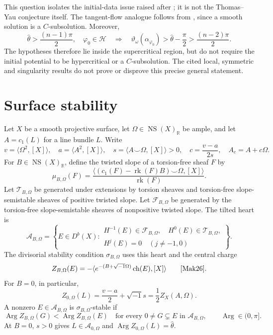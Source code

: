 \documentclass[12pt,reqno]{amsart}
\numberwithin{equation}{section}
\theoremstyle{plain}
\theoremstyle{definition}
\newcommand{\cH}{\mathcal H}
\newcommand{\R}{\mathbb R}
\DeclareMathOperator{\NS}{NS}
\begin{document}
This question isolates the initial-data issue raised after
\cite[Theorem 1.3]{Tak20}; it is not the Thomas--Yau conjecture itself.
The tangent-flow analogue follows from \cite[Theorem 1.4]{Tak20}, since
a smooth solution is a $C$-subsolution. Moreover,
\[
 \widehat\theta>\frac{(n-1)\pi}{2},\quad \varphi_0\in\cH
 \quad\Longrightarrow\quad
 \vartheta_\omega(\alpha_{\varphi_0})
 >\widehat\theta-\frac\pi2>\frac{(n-2)\pi}{2}.
\]
The hypotheses therefore lie inside the supercritical region, but do
not require the initial potential to be hypercritical or a
$C$-subsolution. The cited local, symmetric and singularity results do
not prove or disprove this precise general statement.

\section{Surface stability}\label{surface-stability}
Let $X$ be a smooth projective surface, let
$\Omega\in\NS(X)_\R$ be ample, and let $A=c_1(L)$ for a line bundle
$L$. Write
\[
 v=\langle\Omega^2,[X]\rangle,\quad
 a=\langle A^2,[X]\rangle,\quad
 s=\langle A\smile\Omega,[X]\rangle>0,\quad
 c=\frac{v-a}{2s},\quad A_c=A+c\Omega.
\]
For $B\in\NS(X)_\R$, define the twisted slope of a torsion-free sheaf
$F$ by
\[
 \mu_{B,\Omega}(F)
 =\frac{\langle(c_1(F)-\operatorname{rk}(F)B)\smile\Omega,[X]\rangle}
        {\operatorname{rk}(F)}.
\]
Let $\mathcal T_{B,\Omega}$ be generated under extensions by torsion
sheaves and torsion-free slope-semistable sheaves of positive twisted
slope. Let $\mathcal F_{B,\Omega}$ be generated by the torsion-free
slope-semistable sheaves of nonpositive twisted slope. The tilted heart is
\[
 \mathcal A_{B,\Omega}
 =\left\{E\in D^b(X):
 \begin{array}{l}
 H^{-1}(E)\in\mathcal F_{B,\Omega},\quad
 H^0(E)\in\mathcal T_{B,\Omega},\\
 H^j(E)=0\quad(j\ne-1,0)
 \end{array}\right\}.
\]
The divisorial stability condition $\sigma_{B,\Omega}$ uses this heart
and the central charge
\[
 Z_{B,\Omega}(E)
 =-\langle e^{-(B+\sqrt{-1}\Omega)}\operatorname{ch}(E),[X]\rangle
 \qquad\text{\cite[Section 2]{Mak26}.}
\]
For $B=0$, in particular,
\begin{equation}\label{categorical-central-charge}
 Z_{0,\Omega}(L)=\frac{v-a}{2}+\sqrt{-1}s
               =\frac12Z_X(A,\Omega).
\end{equation}
A nonzero $E\in\mathcal A_{B,\Omega}$ is $\sigma_{B,\Omega}$-stable if
\[
 \operatorname{Arg}Z_{B,\Omega}(G)
 <\operatorname{Arg}Z_{B,\Omega}(E)
 \quad\text{for every }0\ne G\subsetneq E
 \text{ in }\mathcal A_{B,\Omega},
 \qquad\operatorname{Arg}\in(0,\pi].
\]
At $B=0$, $s>0$ gives $L\in\mathcal A_{0,\Omega}$ and
$\operatorname{Arg}Z_{0,\Omega}(L)=\widehat\theta$.
\end{document}
